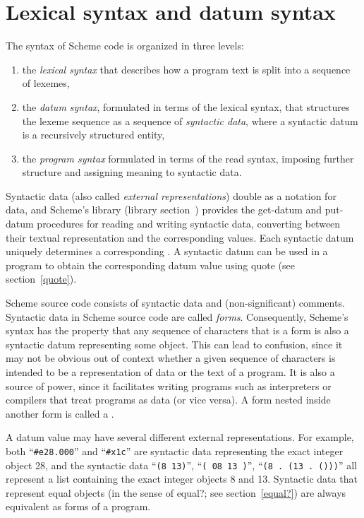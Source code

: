 \chapter{Lexical syntax and datum syntax}
\label{readsyntaxchapter}

The syntax of Scheme code is organized in three levels:
%
\begin{enumerate}
\item the \textit{lexical syntax} that describes how a program text is split
  into a sequence of lexemes,
\item the \textit{datum syntax}, formulated in terms of the lexical
  syntax, that structures the lexeme sequence as a sequence of
  \textit{syntactic data}, where a syntactic datum is
    a recursively structured entity,
\item the \textit{program syntax} formulated in terms of the read
  syntax, imposing further structure and assigning meaning to
  syntactic data.
\end{enumerate}
%
Syntactic data (also called \textit{external
  representations}) double
as a notation for data, and Scheme's  library
(library section~)
provides the {\cf get-datum} and {\cf put-datum} procedures
for reading and writing syntactic data, converting between their
textual representation and the corresponding values. 
Each syntactic datum uniquely determines a corresponding .
A syntactic datum can be used in a program to obtain the corresponding
datum value using {\cf quote} (see section~\ref{quote}).

Scheme source code consists of syntactic data and (non-significant) comments.
Syntactic data in Scheme source code are called
\textit{forms}.
Consequently, Scheme's syntax has the property that any sequence of
characters that is a form is also a syntactic datum representing
some object.  This can lead to confusion, since it may not be obvious
out of context whether a given sequence of characters is intended to
be a representation of data or the text of a program.
It is also a source of power, since it
facilitates writing programs such as interpreters or compilers that
treat programs as data (or vice versa).  A form nested inside another form is
called a .

A datum value may have several different external representations.
For example, both ``{\tt \#e28.000}'' and
``{\tt\#x1c}'' are syntactic data representing the exact integer
object 28, and the syntactic data ``{\tt(8 13)}'', ``{\tt( 08 13 )}'', ``{\tt(8 .\
  (13 .\ ()))}''
all represent a list containing the exact integer objects 8 and 13. 
Syntactic data that represent equal objects (in the sense of {\cf
  equal?}; see section~\ref{equal?}) are always equivalent 
as forms of a program.


